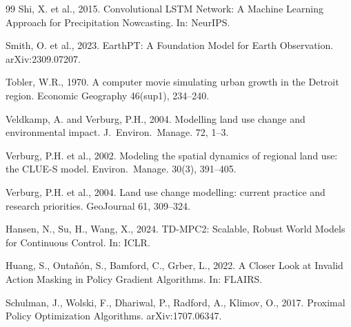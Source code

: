 \documentclass{article}
\begin{document}
\begin{thebibliography}{99}
Shi, X. et al., 2015. Convolutional LSTM Network: A Machine Learning Approach for Precipitation Nowcasting. In: NeurIPS.

Smith, O. et al., 2023. EarthPT: A Foundation Model for Earth Observation. arXiv:2309.07207.

Tobler, W.R., 1970. A computer movie simulating urban growth in the Detroit region. Economic Geography 46(sup1), 234--240.

Veldkamp, A. and Verburg, P.H., 2004. Modelling land use change and environmental impact. J.~Environ.~Manage. 72, 1--3.

Verburg, P.H. et al., 2002. Modeling the spatial dynamics of regional land use: the CLUE-S model. Environ.~Manage. 30(3), 391--405.

Verburg, P.H. et al., 2004. Land use change modelling: current practice and research priorities. GeoJournal 61, 309--324.

Hansen, N., Su, H., Wang, X., 2024. TD-MPC2: Scalable, Robust World Models for Continuous Control. In: ICLR.

Huang, S., Onta\~{n}\'{o}n, S., Bamford, C., Grber, L., 2022. A Closer Look at Invalid Action Masking in Policy Gradient Algorithms. In: FLAIRS.

Schulman, J., Wolski, F., Dhariwal, P., Radford, A., Klimov, O., 2017. Proximal Policy Optimization Algorithms. arXiv:1707.06347.

\end{thebibliography}
\end{document}
